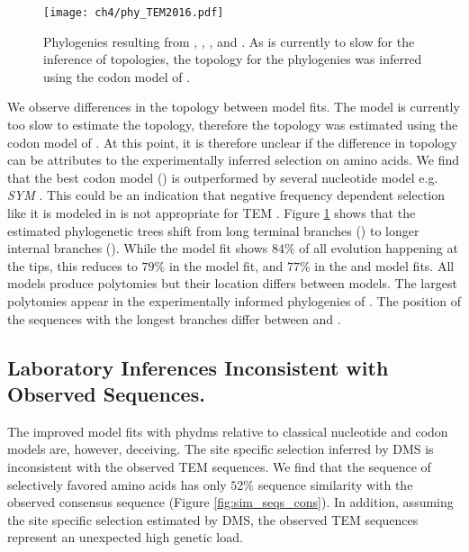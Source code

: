 \singlespacing
\begin{figure}[H]
     \centering
	\texttt{[image: ch4/phy\_TEM2016.pdf]}
	\caption{Phylogenies resulting from \selac, \selacDMS, \phydms, and \gy. As \selac is currently to slow for the inference of topologies, the topology for the \selac phylogenies was inferred using the codon model of \citet{KosiolEtAl07}.}
	\label{fig:phylo}
\end{figure}
\doublespacing

We observe differences in the topology between model fits.
The \selac model is currently too slow to estimate the topology, therefore the topology was estimated using the codon model of \citet{KosiolEtAl07}.
At this point, it is therefore unclear if the difference in topology can be attributes to the experimentally inferred selection on amino acids.
We find that the best codon model (\gy) \citep{GoldmanAndYang1994} is outperformed by several nucleotide model e.g. \emph{SYM} \citep{zharkikh1994}.
This could be an indication that negative frequency dependent selection like it is modeled in \gy is not appropriate for TEM \citep{GoldmanAndYang1994,beaulieu2018}.
Figure \ref{fig:phylo} shows that the estimated phylogenetic trees shift from long terminal branches (\selac) to longer internal branches (\phydms).
While the \selac model fit shows $84 \%$ of all evolution happening at the tips, this reduces to $79 \%$ in the \selacDMS model fit, and $77 \%$ in the \phydms and \gy model fits.
All models produce polytomies but their location differs between models.
The largest polytomies appear in the experimentally informed phylogenies of \phydms.
The position of the sequences with the longest branches differ between \selac and \phydms.


\subsection{Laboratory Inferences Inconsistent with Observed Sequences.}
The improved model fits with phydms relative to classical nucleotide and codon models are, however, deceiving.
The site specific selection inferred by DMS is inconsistent with the observed TEM sequences.
We find that the sequence of selectively favored amino acids has only $52 \%$ sequence similarity with the observed consensus sequence (Figure \ref{fig:sim_seqs_cons}).
In addition, assuming the site specific selection estimated by DMS, the observed TEM sequences represent an unexpected high genetic load.

